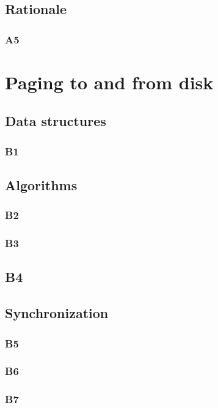 \documentclass[a4wide, 11pt]{article}
\begin{document}
\subsection{Rationale}
\subsubsection{A5}

\section{Paging to and from disk}

\subsection{Data structures}
\subsubsection{B1}

\subsection{Algorithms}
\subsubsection{B2}

\subsubsection{B3}

\subsection{B4}

\subsection{Synchronization}
\subsubsection{B5}

\subsubsection{B6}

\subsubsection{B7}
\end{document}

